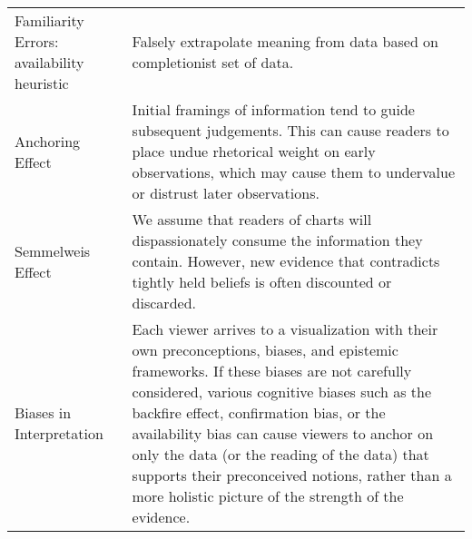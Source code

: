 \begin{longtable}{p{3cm}p{14cm}}
 \rowcolor{colord}Familiarity Errors: availability heuristic & Falsely extrapolate meaning from data based on completionist set of data. \cite{few2019loom}\\
 \rowcolor{colord-opaque}Anchoring Effect  & Initial framings of information tend to guide subsequent judgements. This can cause readers to place undue rhetorical weight on early observations, which may cause them to undervalue or distrust later observations.  \cite{ritchie2019lie, hullman2011visualization}\\
 \rowcolor{colord}Semmelweis Effect & We assume that readers of charts will dispassionately consume the information they contain. However, new evidence that contradicts tightly held beliefs is often discounted or discarded. \cite{valdez2017framework}\\
 \rowcolor{colord-opaque}Biases in \newline Interpretation & Each viewer arrives to a visualization with their own preconceptions, biases, and epistemic frameworks. If these biases are not carefully considered, various cognitive biases such as the backfire effect, confirmation bias, or the availability bias can cause viewers to anchor on only the data (or the reading of the data) that supports their preconceived notions, rather than a more holistic picture of the strength of the evidence. \cite{dignazio2019draft, d2016feminist,valdez2017framework, few2019loom,wall2017warning}\\
\end{longtable}
\label{table:mirage-table}
